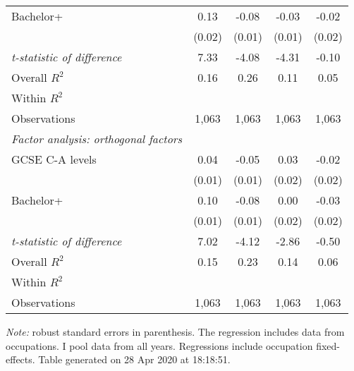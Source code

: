 \begin{center}
\begin{threeparttable}[!h]
\begin{tabular}{lcccc}
\hspace{3mm}Bachelor+&        0.13\sym{***}&       -0.08\sym{***}&       -0.03\sym{*}  &       -0.02         \\
                    &      (0.02)         &      (0.01)         &      (0.01)         &      (0.02)         \\
\textit{t-statistic of difference}&        7.33         &       -4.08         &       -4.31         &       -0.10         \\
\midrule Overall $ R^2$&        0.16         &        0.26         &        0.11         &        0.05         \\
Within $ R^2$       &                     &                     &                     &                     \\
Observations        &       1,063         &       1,063         &       1,063         &       1,063         \\
\midrule \vspace{1mm}\textit{Factor analysis: orthogonal factors} \\ 
\hspace{3mm}GCSE C-A levels&        0.04\sym{**} &       -0.05\sym{***}&        0.03         &       -0.02         \\
                    &      (0.01)         &      (0.01)         &      (0.02)         &      (0.02)         \\
\hspace{3mm}Bachelor+&        0.10\sym{***}&       -0.08\sym{***}&        0.00         &       -0.03         \\
                    &      (0.01)         &      (0.01)         &      (0.02)         &      (0.02)         \\
\textit{t-statistic of difference}&        7.02         &       -4.12         &       -2.86         &       -0.50         \\
\midrule Overall $ R^2$&        0.15         &        0.23         &        0.14         &        0.06         \\
Within $ R^2$       &                     &                     &                     &                     \\
Observations        &       1,063         &       1,063         &       1,063         &       1,063         \\
\bottomrule
\bottomrule
\end{tabular}
\begin{tablenotes}
\item \footnotesize \textit{Note:} robust standard errors in parenthesis. The regression includes data from occupations. I pool data from all years. Regressions include occupation fixed-effects. Table generated on 28 Apr 2020 at 18:18:51.
\end{tablenotes}
\end{threeparttable}
\end{center}
